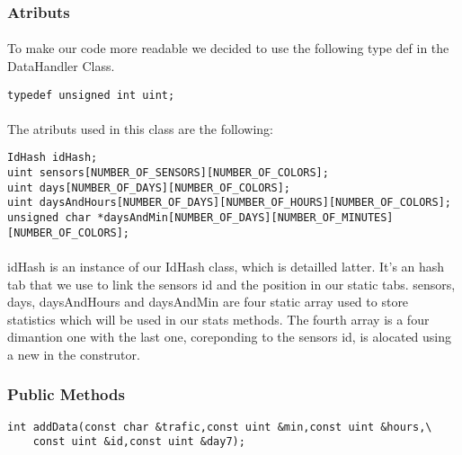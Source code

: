 \documentclass[a4paper, 12pts]{article}
\begin{document}
\subsubsection{Atributs}
\paragraph{}
	To make our code more readable we decided to use the following type def in the DataHandler Class.
\begin{lstlisting}
typedef unsigned int uint;
\end{lstlisting}

\paragraph{}
	The atributs used in this class are the following:
\begin{lstlisting}
IdHash idHash;
uint sensors[NUMBER_OF_SENSORS][NUMBER_OF_COLORS];
uint days[NUMBER_OF_DAYS][NUMBER_OF_COLORS];
uint daysAndHours[NUMBER_OF_DAYS][NUMBER_OF_HOURS][NUMBER_OF_COLORS];
unsigned char *daysAndMin[NUMBER_OF_DAYS][NUMBER_OF_MINUTES][NUMBER_OF_COLORS];
\end{lstlisting}

\paragraph{}
	idHash is an instance of our IdHash class, which is detailled latter. It's an hash tab that we use to link the sensors id and the position in our static tabs.
	sensors, days, daysAndHours and daysAndMin are four static array used to store statistics which will be used in our stats methods. The fourth array is a four dimantion one with the last one, coreponding to the sensors id, is alocated using a new in the construtor.

\subsubsection{Public Methods}

\begin{lstlisting}
int addData(const char &trafic,const uint &min,const uint &hours,\
	const uint &id,const uint &day7);
\end{lstlisting}
\end{document}
